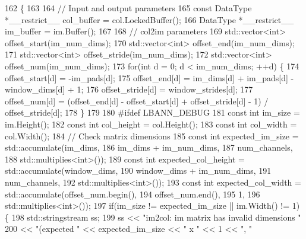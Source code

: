 \begin{DoxyCode}
162                                         \{
163 
164   \textcolor{comment}{// Input and output parameters}
165   \textcolor{keyword}{const} DataType *\_\_restrict\_\_ col\_buffer = col.LockedBuffer();
166   DataType *\_\_restrict\_\_ im\_buffer = im.Buffer();
167 
168   \textcolor{comment}{// col2im parameters}
169   std::vector<int> offset\_start(im\_num\_dims);
170   std::vector<int> offset\_end(im\_num\_dims);
171   std::vector<int> offset\_stride(im\_num\_dims);
172   std::vector<int> offset\_num(im\_num\_dims);
173   \textcolor{keywordflow}{for}(\textcolor{keywordtype}{int} d = 0; d < im\_num\_dims; ++d) \{
174     offset\_start[d] = -im\_pads[d];
175     offset\_end[d] = im\_dims[d] + im\_pads[d] - window\_dims[d] + 1;
176     offset\_stride[d] = window\_strides[d];
177     offset\_num[d] = (offset\_end[d] - offset\_start[d] + offset\_stride[d] - 1) / offset\_stride[d];
178   \}
179 
180 \textcolor{preprocessor}{  #ifdef LBANN\_DEBUG}
181   \textcolor{keyword}{const} \textcolor{keywordtype}{int} im\_size = im.Height();
182   \textcolor{keyword}{const} \textcolor{keywordtype}{int} col\_height = col.Height();
183   \textcolor{keyword}{const} \textcolor{keywordtype}{int} col\_width = col.Width();
184   \textcolor{comment}{// Check matrix dimensions}
185   \textcolor{keyword}{const} \textcolor{keywordtype}{int} expected\_im\_size = std::accumulate(im\_dims,
186                                                im\_dims + im\_num\_dims,
187                                                num\_channels,
188                                                std::multiplies<int>());
189   \textcolor{keyword}{const} \textcolor{keywordtype}{int} expected\_col\_height = std::accumulate(window\_dims,
190                                                   window\_dims + im\_num\_dims,
191                                                   num\_channels,
192                                                   std::multiplies<int>());
193   \textcolor{keyword}{const} \textcolor{keywordtype}{int} expected\_col\_width = std::accumulate(offset\_num.begin(),
194                                                  offset\_num.end(),
195                                                  1,
196                                                  std::multiplies<int>());
197   \textcolor{keywordflow}{if}(im\_size != expected\_im\_size || im.Width() != 1) \{
198     std::stringstream ss;
199     ss << \textcolor{stringliteral}{"im2col: im matrix has invalid dimensions "}
200        << \textcolor{stringliteral}{"(expected "} << expected\_im\_size << \textcolor{stringliteral}{" x "} << 1 << \textcolor{stringliteral}{", "}

\end{DoxyCode}
